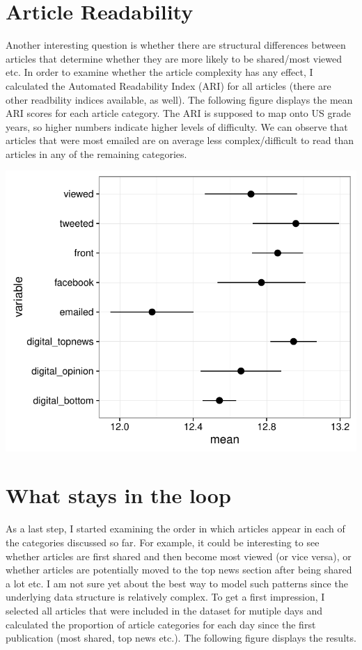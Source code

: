 \documentclass[12pt]{article}\usepackage[]{graphicx}\usepackage[]{color}
\makeatletter
\def\maxwidth{ %
  \ifdim\Gin@nat@width>\linewidth
    \linewidth
  \else
    \Gin@nat@width
  \fi
}
\newenvironment{knitrout}{}{} %
\makeatother
\begin{document}
\section{Article Readability}

Another interesting question is whether there are structural differences between articles that determine whether they are more likely to be shared/most viewed etc. In order to examine whether the article complexity has any effect, I calculated the Automated Readability Index (ARI) for all articles (there are other readbility indices available, as well). The following figure displays the mean ARI scores for each article category. The ARI is supposed to map onto US grade years, so higher numbers indicate higher levels of difficulty. We can observe that articles that were most emailed are on average less complex/difficult to read than articles in any of the remaining categories.

\begin{knitrout}
\color{fgcolor}
\includegraphics[width=\maxwidth]{figure/unnamed-chunk-10-1} 

\end{knitrout}


\section{What stays in the loop}

As a last step, I started examining the order in which articles appear in each of the categories discussed so far. For example, it could be interesting to see whether articles are first shared and then become most viewed (or vice versa), or whether articles are potentially moved to the top news section after being shared a lot etc. I am not sure yet about the best way to model such patterns since the underlying data structure is relatively complex. To get a first impression, I selected all articles that were included in the dataset for mutiple days and calculated the proportion of article categories for each day since the first publication (most shared, top news etc.). The following figure displays the results.
\end{document}
